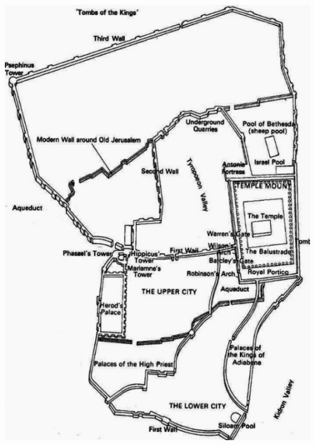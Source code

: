 \documentclass[letterpaper]{report}
\begin{document}
\includegraphics[height=0.9\textheight]{JerusalemAsItWas}

\clearpage
\end{document}
